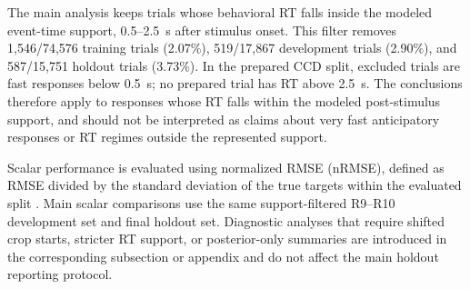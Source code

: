 \documentclass[12pt]{article}
\begin{document}
The main analysis keeps trials whose behavioral RT falls inside the modeled event-time support, 0.5--2.5~s after stimulus onset. This filter removes 1{,}546/74{,}576 training trials (2.07\%), 519/17{,}867 development trials (2.90\%), and 587/15{,}751 holdout trials (3.73\%). In the prepared CCD split, excluded trials are fast responses below 0.5~s; no prepared trial has RT above 2.5~s. The conclusions therefore apply to responses whose RT falls within the modeled post-stimulus support, and should not be interpreted as claims about very fast anticipatory responses or RT regimes outside the represented support.

Scalar performance is evaluated using normalized RMSE (nRMSE), defined as RMSE divided by the standard deviation of the true targets within the evaluated split \citep{EEGChallengeWebsite2025}. Main scalar comparisons use the same support-filtered R9--R10 development set and final holdout set. Diagnostic analyses that require shifted crop starts, stricter RT support, or posterior-only summaries are introduced in the corresponding subsection or appendix and do not affect the main holdout reporting protocol.
\end{document}
